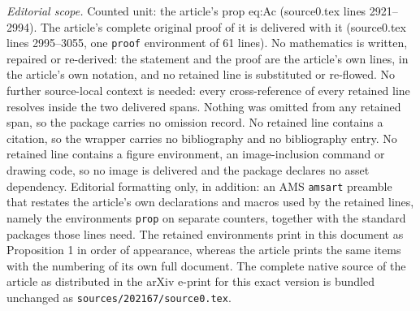 \documentclass[10pt,a4paper]{amsart}
\begin{document}
\noindent\textit{Editorial scope.} Counted unit: the article's prop eq:Ac (source0.tex lines 2921--2994). The article's complete original proof of it is delivered with it (source0.tex lines 2995--3055, one \texttt{proof} environment of 61 lines). No mathematics is written, repaired or re-derived: the statement and the proof are the article's own lines, in the article's own notation, and no retained line is substituted or re-flowed.  No further source-local context is needed: every cross-reference of every retained line resolves inside the two delivered spans.  Nothing was omitted from any retained span, so the package carries no omission record.  No retained line contains a citation, so the wrapper carries no bibliography and no bibliography entry.  No retained line contains a figure environment, an image-inclusion command or drawing code, so no image is delivered and the package declares no asset dependency.  Editorial formatting only, in addition: an AMS \texttt{amsart} preamble that restates the article's own declarations and macros used by the retained lines, namely the environments \texttt{prop} on separate counters, together with the standard packages those lines need.  The retained environments print in this document as Proposition 1 in order of appearance, whereas the article prints the same items with the numbering of its own full document.  The complete native source of the article as distributed in the arXiv e-print for this exact version is bundled unchanged as \texttt{sources/202167/source0.tex}.
\end{document}
